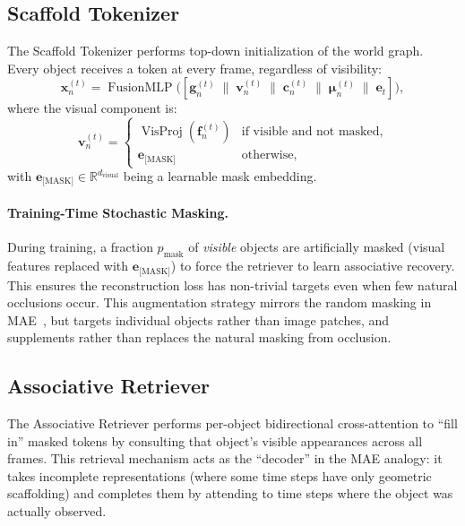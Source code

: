\documentclass[runningheads]{llncs}
\newcommand{\mR}{\mathbb{R}}
\newcommand{\op}[1]{\operatorname{#1}}
\newcommand{\mat}[1]{\bm{#1}}
\begin{document}
\subsection{Scaffold Tokenizer}
\label{sec:scaffold_tokenizer}

The Scaffold Tokenizer performs top-down initialization of the world graph.  Every object receives a token at every frame, regardless of visibility:
\begin{equation}
    \mat{x}_n^{(t)} = \op{FusionMLP}\bigl([\mat{g}_n^{(t)} \;\|\; \mat{v}_n^{(t)} \;\|\; \mat{c}_n^{(t)} \;\|\; \mat{\mu}_n^{(t)} \;\|\; \mat{e}_t]\bigr),
    \label{eq:scaffold_token}
\end{equation}
where the visual component is:
\begin{equation}
    \mat{v}_n^{(t)} = \begin{cases}
        \op{VisProj}(\mat{f}_n^{(t)}) & \text{if visible and not masked}, \\
        \mat{e}_{\text{[MASK]}} & \text{otherwise},
    \end{cases}
    \label{eq:scaffold_visual}
\end{equation}
with $\mat{e}_{\text{[MASK]}} \in \mR^{d_{\text{visual}}}$ being a learnable mask embedding.

\paragraph{Training-Time Stochastic Masking.}  During training, a fraction $p_{\text{mask}}$ of \emph{visible} objects are artificially masked (visual features replaced with $\mat{e}_{\text{[MASK]}}$) to force the retriever to learn associative recovery.  This ensures the reconstruction loss has non-trivial targets even when few natural occlusions occur.  This augmentation strategy mirrors the random masking in MAE~\cite{he2022masked}, but targets individual objects rather than image patches, and supplements rather than replaces the natural masking from occlusion.

\subsection{Associative Retriever}
\label{sec:associative_retriever}

The Associative Retriever performs per-object bidirectional cross-attention to ``fill in'' masked tokens by consulting that object's visible appearances across all frames.  This retrieval mechanism acts as the ``decoder'' in the MAE analogy: it takes incomplete representations (where some time steps have only geometric scaffolding) and completes them by attending to time steps where the object was actually observed.
\end{document}
